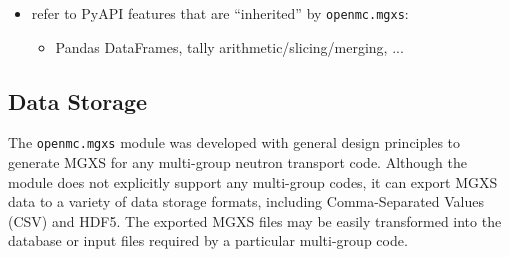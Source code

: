 \begin{itemize}[noitemsep]
\item refer to PyAPI features that are ``inherited'' by \texttt{openmc.mgxs}:
  \begin{itemize}[noitemsep]
  \item Pandas DataFrames, tally arithmetic/slicing/merging, ...
  \end{itemize}
\end{itemize}

\subsection{Data Storage}
\label{subsec:xml-inputs}

The \texttt{openmc.mgxs} module was developed with general design principles to generate MGXS for any multi-group neutron transport code. Although the module does not explicitly support any multi-group codes, it can export MGXS data to a variety of data storage formats, including Comma-Separated Values (CSV) and HDF5. The exported MGXS files may be easily transformed into the database or input files required by a particular multi-group code.
